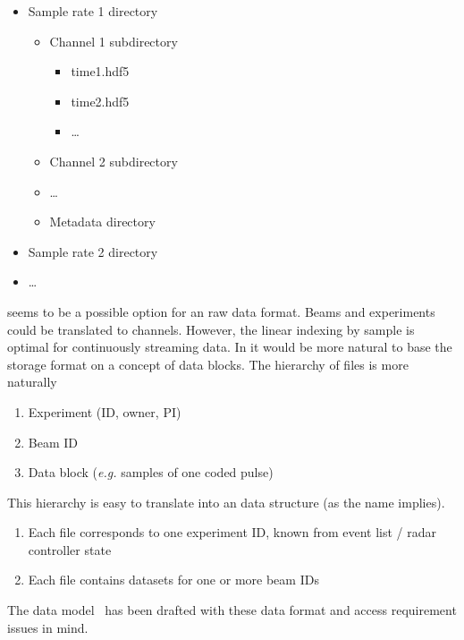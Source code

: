\documentclass[12pt,a4paper]{article}
\begin{document}
\vspace{0.4cm}
\begin{minipage}{\textwidth}

\begin{itemize}
    \item Sample rate 1 directory
    \begin{itemize}
        \item Channel 1 subdirectory
        \begin{itemize}
            \item time1.hdf5
            \item time2.hdf5
            \item \ldots
        \end{itemize}
        \item Channel 2 subdirectory
        \item \ldots
        \item Metadata directory
    \end{itemize}
    \item Sample rate 2 directory
    \item \ldots
\end{itemize}
\end{minipage}
\vspace{0.4cm}

\DRF seems to be a possible option for an \ED raw data format. Beams and experiments could be translated to \DRF channels. However, the linear indexing by sample is optimal for continuously streaming data. In \ED it would be more natural to base the storage format on a concept of data blocks.  The hierarchy of \ED files is more naturally

\begin{enumerate}
    \item Experiment (ID, owner, PI)
    \item Beam ID
    \item Data block (\emph{e.g.} samples of one coded pulse)
\end{enumerate}

This hierarchy is easy to translate into an \HDF data structure (as the name implies). 

\begin{enumerate}
    \item Each file corresponds to one experiment ID, known from event list / radar controller state
    \item Each file contains datasets for one or more beam IDs
\end{enumerate}
  The \ED data model~\cite{data-model} has been drafted with these data format and access requirement issues in mind.
 
\end{document}
